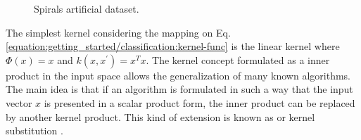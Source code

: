 \documentclass[letterpaper,10pt,english]{sphinxmanual}
\let\sphinxpxdimen\pdfpxdimen\else\newdimen\sphinxpxdimen
\begin{document}
\begin{figure}[htbp]
\centering
\capstart

\noindent\sphinxincludegraphics[width=450\sphinxpxdimen]{{spirals}.png}
\caption{Spirals artificial dataset.}\label{\detokenize{getting_started/classification:spirals-data}}\end{figure}

\sphinxAtStartPar
The simplest kernel considering the mapping on Eq. \eqref{equation:getting_started/classification:kernel-func} is the linear kernel where
\(\Phi(x) = x\) and \(k(x, x^{'}) = x^{T}x\). The kernel concept formulated as a inner product in the
input space allows the generalization of many known algorithms. The main idea is that if an algorithm is formulated
in such a way that the input vector \(x\) is presented in a scalar product form, the inner product can be replaced
by another kernel product. This kind of extension is known as  or kernel substitution .
\end{document}
